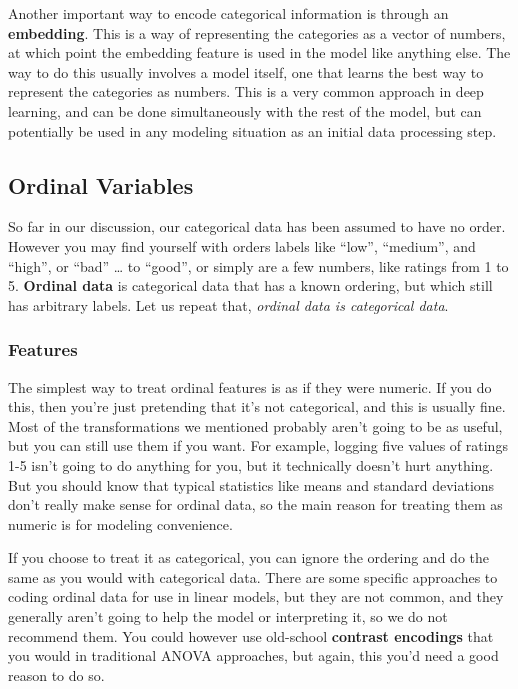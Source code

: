 \documentclass[
  letterpaper,
]{krantz}
\begin{document}
Another important way to encode categorical information is through an
\textbf{embedding}. This is a way of representing the categories as a
vector of numbers, at which point the embedding feature is used in the
model like anything else. The way to do this usually involves a model
itself, one that learns the best way to represent the categories as
numbers. This is a very common approach in deep learning, and can be
done simultaneously with the rest of the model, but can potentially be
used in any modeling situation as an initial data processing step.

\subsection{Ordinal Variables}\label{ordinal-variables}

So far in our discussion, our categorical data has been assumed to have
no order. However you may find yourself with orders labels like ``low'',
``medium'', and ``high'', or ``bad'' \ldots{} to ``good'', or simply are
a few numbers, like ratings from 1 to 5. \textbf{Ordinal data} is
categorical data that has a known ordering, but which still has
arbitrary labels. Let us repeat that, \emph{ordinal data is categorical
data}.

\subsubsection{Features}\label{features}

The simplest way to treat ordinal features is as if they were numeric.
If you do this, then you're just pretending that it's not categorical,
and this is usually fine. Most of the transformations we mentioned
probably aren't going to be as useful, but you can still use them if you
want. For example, logging five values of ratings 1-5 isn't going to do
anything for you, but it technically doesn't hurt anything. But you
should know that typical statistics like means and standard deviations
don't really make sense for ordinal data, so the main reason for
treating them as numeric is for modeling convenience.

If you choose to treat it as categorical, you can ignore the ordering
and do the same as you would with categorical data. There are some
specific approaches to coding ordinal data for use in linear models, but
they are not common, and they generally aren't going to help the model
or interpreting it, so we do not recommend them. You could however use
old-school \textbf{contrast encodings} that you would in traditional
ANOVA approaches, but again, this you'd need a good reason to do so.
\end{document}
